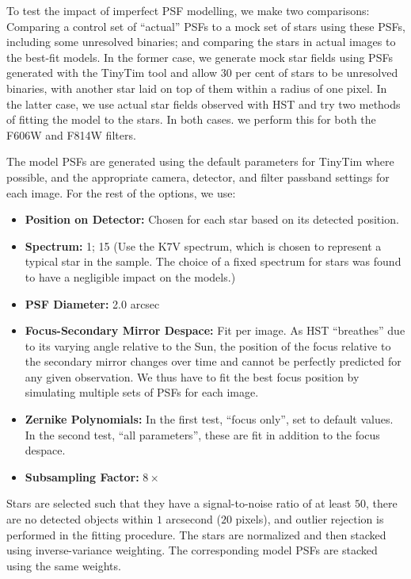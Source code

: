 \documentclass[useAMS,usenatbib]{mnras}
\begin{document}
To test the impact of imperfect PSF modelling, we make two
comparisons: Comparing a control set of ``actual'' PSFs to a mock set
of stars using these PSFs, including some unresolved binaries; and
comparing the stars in actual images to the best-fit models. In the
former case, we generate mock star fields using PSFs generated with
the TinyTim tool \citep{2011SPIE.8127E..0JK} and allow 30 per cent of
stars to be unresolved binaries, with another star laid on top of them
within a radius of one pixel. In the latter case, we use actual star
fields observed with HST and try two methods of fitting the model to
the stars. In both cases. we perform this for both the F606W and F814W
filters.

The model PSFs are generated using the default parameters for TinyTim
where possible, and the appropriate camera, detector, and filter
passband settings for each image. For the rest of the options, we use:
\begin{itemize}
  \item \textbf{Position on Detector:} Chosen for each star based on its
detected position.
  \item \textbf{Spectrum:} 1; 15 (Use the K7V spectrum, which is chosen
to represent a typical star in the sample. The choice of a fixed
spectrum for stars was found to have a negligible impact on the
models.)
  \item \textbf{PSF Diameter:} 2.0 arcsec
  \item \textbf{Focus-Secondary Mirror Despace:} Fit per image. As HST
    ``breathes'' due to its varying angle relative to the Sun, the
    position of the focus relative to the secondary mirror changes
    over time and cannot be perfectly predicted for any given
    observation. We thus have to fit the best focus position by
    simulating multiple sets of PSFs for each image.
  \item \textbf{Zernike Polynomials:} In the first test, ``focus
    only'', set to default values. In the second test, ``all
    parameters'', these are fit in addition to the focus despace.
  \item \textbf{Subsampling Factor:} $8\times$
\end{itemize}

Stars are selected such that they have a signal-to-noise ratio of at
least $50$, there are no detected objects within $1$ arcsecond ($20$
pixels), and outlier rejection is performed in the fitting procedure.
The stars are normalized and then stacked using inverse-variance
weighting. The corresponding model PSFs are stacked using the same
weights.
\end{document}
